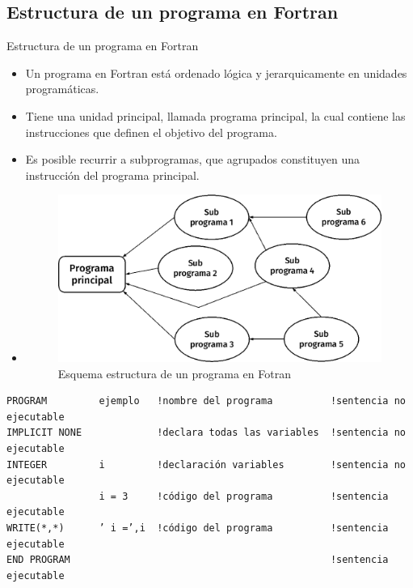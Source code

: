 
\subsection{Estructura de un programa en Fortran}

\begin{frame}[fragile]{Estructura de un programa en Fortran}
  \begin{itemize}[<+(1)->]
    \item Un programa en Fortran está ordenado lógica y jerarquicamente en unidades programáticas. 
    \item Tiene una unidad principal, llamada programa principal, la cual contiene las instrucciones que definen el objetivo del programa.
    \item Es posible recurrir a subprogramas, que agrupados constituyen una instrucción del programa principal. 
    \item [] 
      \begin{figure}
      \includegraphics[width=1\textwidth]{./resources/structurep.png}
      \caption{Esquema estructura de un programa en Fotran}
      \end{figure}
 
 \end{itemize} 
  \begin{verbatim}
PROGRAM         ejemplo   !nombre del programa          !sentencia no ejecutable
IMPLICIT NONE             !declara todas las variables  !sentencia no ejecutable                               
INTEGER         i         !declaración variables        !sentencia no ejecutable
                i = 3     !código del programa          !sentencia ejecutable
WRITE(*,*)      ’ i =’,i  !código del programa          !sentencia ejecutable
END PROGRAM                                             !sentencia ejecutable
  \end{verbatim}

\end{frame}